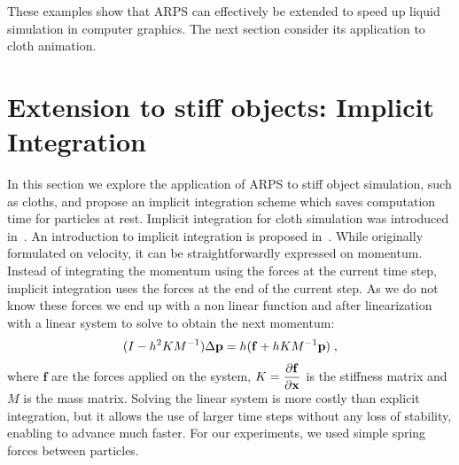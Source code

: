 These examples show that ARPS can effectively be extended to speed up liquid simulation in computer graphics. The next section consider its application to cloth animation.

\section{Extension to stiff objects: Implicit Integration} 
\label{sec:arps_implicit}
In this section we explore the application of ARPS to stiff object simulation, such as cloths, and propose an implicit integration scheme which saves computation time for particles at rest.
Implicit integration for cloth simulation was introduced in~\cite{Baraff1998}. 
An introduction to implicit integration is proposed in~\cite{Witkin2001}.
While originally formulated on velocity, it can be straightforwardly expressed on momentum.
Instead of integrating the momentum using the forces at the current time step, implicit integration uses the forces at the end of the current step.
As we do not know these forces we end up with a non linear function and after linearization with a linear system to solve to obtain the next momentum:
\begin{equation}
    \label{eq:implicit}
    ( I -h^{2}KM^{-1} ) \Delta \mathbf{p} = h( \mathbf{f} + h KM^{-1}\mathbf{p} ) \;,
\end{equation}
where $\mathbf{f}$ are the forces applied on the system, $\displaystyle K = \frac{\partial \mathbf{f}}{ \partial \mathbf{x}}$ is the stiffness matrix and $M$ is the mass matrix. 
Solving the linear system is more costly than explicit integration, but it allows the use of larger time steps without any loss of stability, enabling to advance much faster.
For our experiments, we used simple spring forces between particles.

